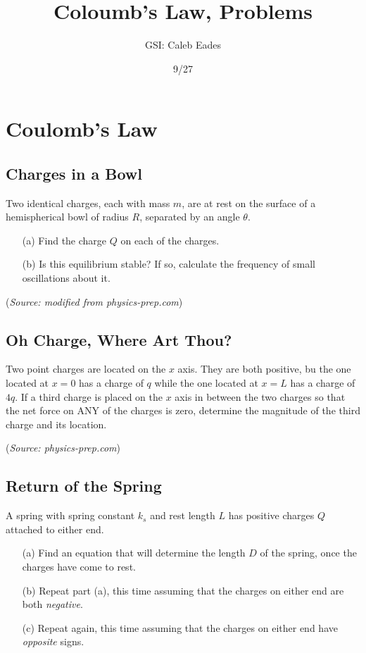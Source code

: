 \documentclass{article}
\begin{document}
\title{Coloumb's Law, Problems}
\author{GSI: Caleb Eades}
\date{9/27}
\maketitle

\section{Coulomb's Law}

\subsection{Charges in a Bowl}

Two identical charges, each with mass $m$, are at rest on the surface of a hemispherical bowl of radius $R$, separated by an angle $\theta$.
\begin{itemize}
	\item[(a)] Find the charge $Q$ on each of the charges.
	\item[(b)] Is this equilibrium stable? If so, calculate the frequency of small oscillations about it.
\end{itemize}

(\textit{Source: modified from physics-prep.com})

\subsection{Oh Charge, Where Art Thou?}

Two point charges are located on the $x$ axis. They are both positive, bu the one located at $x=0$ has a charge of $q$ while the one located at $x=L$ has a charge of $4q$. If a third charge is placed on the $x$ axis in between the two charges so that the net force on ANY of the charges is zero, determine the magnitude of the third charge and its location.

(\textit{Source: physics-prep.com})

\subsection{Return of the Spring}

A spring with spring constant $k_s$ and rest length $L$ has positive charges $Q$ attached to either end.
\begin{itemize}
	\item[(a)] Find an equation that will determine the length $D$ of the spring, once the charges have come to rest.
	\item[(b)] Repeat part (a), this time assuming that the charges on either end are both \textit{negative}.
	\item[(c)] Repeat again, this time assuming that the charges on either end have \textit{opposite} signs.
\end{itemize}
\end{document}
